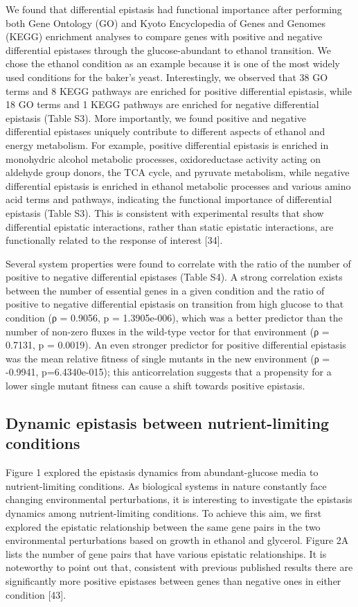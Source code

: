 We found that differential epistasis had functional importance after
performing both Gene Ontology (GO) and Kyoto Encyclopedia of Genes and
Genomes (KEGG) enrichment analyses to compare genes with positive and
negative differential epistases through the glucose-abundant to
ethanol transition. We chose the ethanol condition as an example
because it is one of the most widely used conditions for the baker’s
yeast. Interestingly, we observed that 38 GO terms and 8 KEGG pathways
are enriched for positive differential epistasis, while 18 GO terms
and 1 KEGG pathways are enriched for negative differential epistasis
(Table S3). More importantly, we found positive and negative
differential epistases uniquely contribute to different aspects of
ethanol and energy metabolism. For example, positive differential
epistasis is enriched in monohydric alcohol metabolic processes,
oxidoreductase activity acting on aldehyde group donors, the TCA
cycle, and pyruvate metabolism, while negative differential epistasis
is enriched in ethanol metabolic processes and various amino acid
terms and pathways, indicating the functional importance of
differential epistasis (Table S3). This is consistent with
experimental results that show differential epistatic interactions,
rather than static epistatic interactions, are functionally related to
the response of interest [34].

Several system properties were found to correlate with the ratio of
the number of positive to negative differential epistases (Table
S4). A strong correlation exists between the number of essential genes
in a given condition and the ratio of positive to negative
differential epistasis on transition from high glucose to that
condition (ρ = 0.9056, p = 1.3905e-006), which was a better predictor
than the number of non-zero fluxes in the wild-type vector for that
environment (ρ = 0.7131, p = 0.0019). An even stronger predictor for
positive differential epistasis was the mean relative fitness of
single mutants in the new environment (ρ = -0.9941, p=6.4340e-015);
this anticorrelation suggests that a propensity for a lower single
mutant fitness can cause a shift towards positive epistasis.

\subsection{Dynamic epistasis between nutrient-limiting conditions}

Figure 1 explored the epistasis dynamics from abundant-glucose media
to nutrient-limiting conditions. As biological systems in nature
constantly face changing environmental perturbations, it is
interesting to investigate the epistasis dynamics among
nutrient-limiting conditions. To achieve this aim, we first explored
the epistatic relationship between the same gene pairs in the two
environmental perturbations based on growth in ethanol and
glycerol. Figure 2A lists the number of gene pairs that have various
epistatic relationships. It is noteworthy to point out that,
consistent with previous published results there are significantly
more positive epistases between genes than negative ones in either
condition [43].

